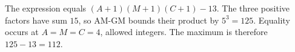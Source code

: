 The expression equals $(A+1)(M+1)(C+1)-13$. The three positive factors have sum $15$, so AM-GM bounds their product by $5^3=125$. Equality occurs at $A=M=C=4$, allowed integers. The maximum is therefore $125-13=\boxed{112}$.
